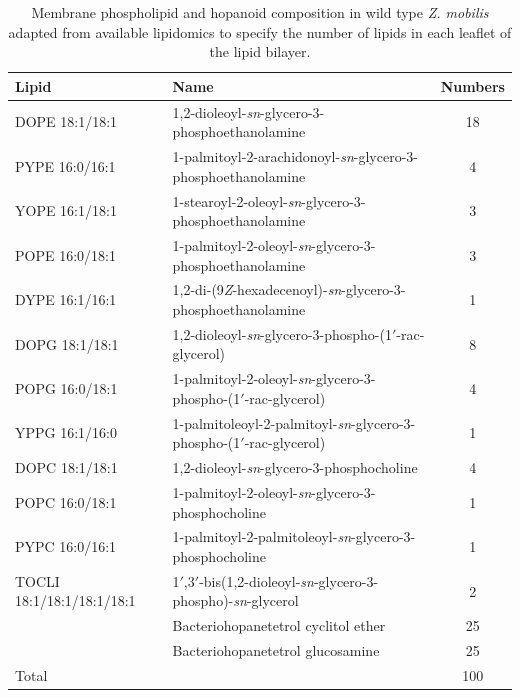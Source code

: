 \begin{table}
	\centering
	\begin{tabular}{p{3.5cm}p{8cm}c}
		\toprule
		Lipid & Name & Numbers \\
		\midrule
		DOPE 18:1/18:1 & 1,2-dioleoyl-\textit{sn}-glycero-3-phosphoethanolamine & 18 \\
		PYPE 16:0/16:1 & 1-palmitoyl-2-arachidonoyl-\textit{sn}-glycero-3-phosphoethanolamine & 4 \\
		YOPE 16:1/18:1 & 1-stearoyl-2-oleoyl-\textit{sn}-glycero-3-phosphoethanolamine & 3 \\
		POPE 16:0/18:1 & 1-palmitoyl-2-oleoyl-\textit{sn}-glycero-3-phosphoethanolamine & 3 \\
		DYPE 16:1/16:1 & 1,2-di-(9\textit{Z}-hexadecenoyl)-\textit{sn}-glycero-3-phosphoethanolamine & 1 \\
		\midrule
		DOPG 18:1/18:1 & 1,2-dioleoyl-\textit{sn}-glycero-3-phospho-(1$'$-rac-glycerol) & 8 \\
		POPG 16:0/18:1 & 1-palmitoyl-2-oleoyl-\textit{sn}-glycero-3-phospho-(1$'$-rac-glycerol) & 4 \\
		YPPG 16:1/16:0 & 1-palmitoleoyl-2-palmitoyl-\textit{sn}-glycero-3-phospho-(1$'$-rac-glycerol) & 1 \\
		\midrule
		DOPC 18:1/18:1 & 1,2-dioleoyl-\textit{sn}-glycero-3-phosphocholine & 4 \\
		POPC 16:0/18:1 & 1-palmitoyl-2-oleoyl-\textit{sn}-glycero-3-phosphocholine & 1 \\
		PYPC 16:0/16:1 & 1-palmitoyl-2-palmitoleoyl-\textit{sn}-glycero-3-phosphocholine & 1 \\
		\midrule
		TOCLI 18:1/18:1/18:1/18:1 & 1$'$,3$'$-bis(1,2-dioleoyl-\textit{sn}-glycero-3-phospho)-\textit{sn}-glycerol & 2 \\
		\midrule
		& Bacteriohopanetetrol cyclitol ether & 25 \\
		& Bacteriohopanetetrol glucosamine  & 25 \\
		\midrule
		Total & & 100 \\
		\bottomrule
	\end{tabular}
	\caption{Membrane phospholipid and hopanoid composition in wild type \emph{Z. mobilis} adapted from available lipidomics\cite{RiveraVazquez2024} to specify the number of lipids in each leaflet of the lipid bilayer.}
	\label{tab:lipid_composition}
\end{table}


